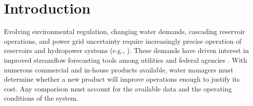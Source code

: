 \documentclass[MLA]{USG} %
\begin{document}


\maketitle




\section{Introduction}


Evolving environmental regulation, changing water demands, cascading reservoir operations, and power grid uncertainty require increasingly precise operation of reservoirs and hydropower systems (e.g., \cite{leeDevelopingResilientReservoir2025,guoReservoirControlOperations2024,badrDamSystemReservoir2023,aljodaUncertaintiesRisksReservoir2021}). These demands have driven interest in improved streamflow forecasting tools among utilities and federal agencies \citep{yangSensitivityForecastValue2021,paganoChallengesOperationalRiver2014,liuAdvancingDataAssimilation2012}. With numerous commercial and in-house products available, water managers must determine whether a new product will improve operations enough to justify its cost. Any comparison must account for the available data and the operating conditions of the system.

\end{document}
